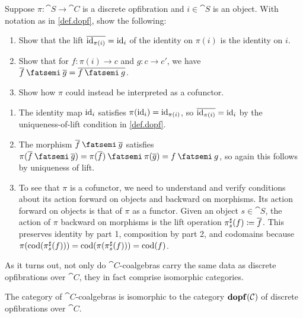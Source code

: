 \documentclass[Book-Poly]{subfiles}
\begin{document}
\begin{exercise}\label{exc.dopf_cof}
Suppose $\pi\colon\cat{S}\to\cat{C}$ is a discrete opfibration and $i\in\cat{S}
$ is an object. With notation as in \cref{def.dopf}, show the following:
\begin{enumerate}
	\item Show that the lift $\overline{\mathrm{id}_{\pi(i)}}=\mathrm{id}_i$ of the identity on $\pi(i)$ is the identity on $i$.
	\item Show that for $f\colon\pi(i)\to c$ and $g\colon c\to c'$, we have $\ol{f}\then\ol{g}=\ol{f\then g}$.
	\item Show how $\pi$ could instead be interpreted as a cofunctor.%
\qedhere
\end{enumerate}
\begin{solution}
\begin{enumerate}
    \item The identity map $\mathrm{id}_i$ satisfies $\pi(\mathrm{id}_i)=\mathrm{id}_{\pi(i)}$, so $\overline{\mathrm{id}_{\pi(i)}}=\mathrm{id}_i$ by the uniqueness-of-lift condition in \cref{def.dopf}.
    \item The morphism $\ol{f}\then\ol{g}$ satisfies $\pi(\ol{f}\then\ol{g})=\pi(\ol{f})\then\pi(\ol{g})=f\then g$, so again this follows by uniqueness of lift.
    \item To see that $\pi$ is a cofunctor, we need to understand and verify conditions about its action forward on objects and backward on morphisms. Its action forward on objects is that of $\pi$ as a functor. Given an object $s\in\cat{S}$, the action of $\pi$ backward on morphisms is the lift operation $\pi^\sharp_s(f)\coloneqq\overline{f}$. This preserves identity by part 1, composition by part 2, and codomains because $\pi(\operatorname{cod}(\pi^\sharp_s(f)))=\operatorname{cod}(\pi(\pi^\sharp_s(f)))=\operatorname{cod}(f)$.
\end{enumerate}
\end{solution}
\end{exercise}

As it turns out, not only do $\cat{C}$-coalgebras carry the same data as discrete opfibrations over $\cat{C}$, they in fact comprise isomorphic categories.

\begin{proposition}
The category of $\cat{C}$-coalgebras is isomorphic to the category $\mathbf{dopf}(\mathcal{C})$ of discrete opfibrations over $\cat{C}$.
\end{proposition}
\end{document}
